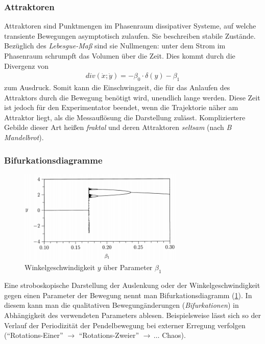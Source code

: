 \documentclass[numbers=noenddot,12pt,a4paper]{scrartcl}
\newcommand{\tilt}[1]{\textit{#1}}
\newcommand{\divergenz}[1]{\textit{div}\left(#1\right)}
\begin{document}
\subsubsection{Attraktoren}
Attraktoren sind Punktmengen im Phasenraum dissipativer Systeme, auf welche transiente Bewegungen asymptotisch zulaufen. Sie beschreiben stabile Zust\"ande. Bez\"uglich des \tilt{Lebesgue-Ma{\ss}} sind sie Nullmengen: unter dem Strom im Phasenraum schrumpft das Volumen \"uber die Zeit. Dies kommt durch die Divergenz von
\begin{align}
\divergenz{\dot x; \dot y}=-\beta_{0}\cdot\delta\left(y\right)-\beta_{1}
\end{align}
zum Ausdruck. Somit kann die Einschwingzeit, die f\"ur das Anlaufen des Attraktors durch die Bewegung ben\"otigt wird, unendlich lange werden. Diese Zeit ist jedoch f\"ur den Experimentator beendet, wenn die Trajektorie n\"aher am Attraktor liegt, als die Messaufl\"osung die Darstellung zul\"asst. Kompliziertere Gebilde dieser Art hei{\ss}en \tilt{fraktal} und deren Attraktoren \tilt{seltsam} (nach \tilt{B Mandelbrot}).
\subsubsection{Bifurkationsdiagramme}
\begin{figure}[h]
\centering
\includegraphics[width=0.7\textwidth]{bifur.png}
\caption{Winkelgeschwindigkeit $y$ über Parameter $\beta_1$} \label{img:bifur}
\end{figure}
Eine stroboskopische Darstellung der Auslenkung oder der Winkelgeschwindigkeit gegen einen Parameter der Bewegung nennt man Bifurkationsdiagramm (\ref{img:bifur}). In diesem kann man die qualitativen Bewegung\"anderungen (\tilt{Bifurkationen}) in Abh\"angigkeit des verwendeten Parameters ablesen. Beispielsweise l\"asst sich so der Verlauf der Periodizit\"at der Pendelbewegung bei externer Erregung verfolgen (``Rotations-Einer'' $\rightarrow$ ``Rotations-Zweier'' $\rightarrow \, \dots$ Chaos).
\end{document}
